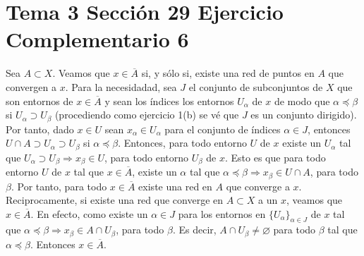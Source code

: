 \documentclass{article}
\begin{document}
\section{Tema 3 Sección 29 Ejercicio Complementario 6}
Sea $A\subset X$. Veamos que $x\in\overline{A}$ si, y sólo si, existe una red de puntos en $A$ que convergen a $x$. Para la necesidadad, sea $J$ el conjunto de subconjuntos de $X$ que son entornos de $x\in \overline{ A}$ y sean los índices los entornos $U_{\alpha}$ de $x$ de modo que $\alpha \preceq \beta$ si $U_{\alpha}\supset U_{\beta}$ (procediendo como ejercicio 1(b) se vé que $J$ es un conjunto dirigido). Por tanto, dado $x\in U$ sean $x_{\alpha}\in U_{\alpha}$ para el conjunto de índices $\alpha\in J$, entonces $U\cap A\supset U_\alpha\supset U_\beta$ si $\alpha\preceq \beta$. Entonces, para todo entorno $U$ de $x$ existe un $U_\alpha$ tal que $U_\alpha\supset U_\beta\Rightarrow x_\beta\in U$, para todo entorno $U_\beta$ de $x$. Esto es que para todo entorno $U$ de $x$ tal que $x\in \overline{A}$, existe un $\alpha$ tal que $\alpha\preceq \beta\Rightarrow x_\beta\in U\cap A$, para todo $\beta$. Por tanto, para todo $x\in \overline{A}$ existe una red en $A$ que converge a $x$. Reciprocamente, si existe una red que converge en $A\subset X$ a un $x$, veamos que $x\in \overline{A}$. En efecto, como existe un $\alpha\in J$ para los entornos en $\{U_\alpha\}_{\alpha\in J}$ de $x$ tal que $\alpha\preceq\beta \Rightarrow x_\beta \in A\cap U_\beta$, para todo $\beta$. Es decir, $A\cap U_\beta\neq \varnothing$ para todo $\beta$ tal que $\alpha\preceq \beta$. Entonces $x\in \overline{A}$.
\end{document}
